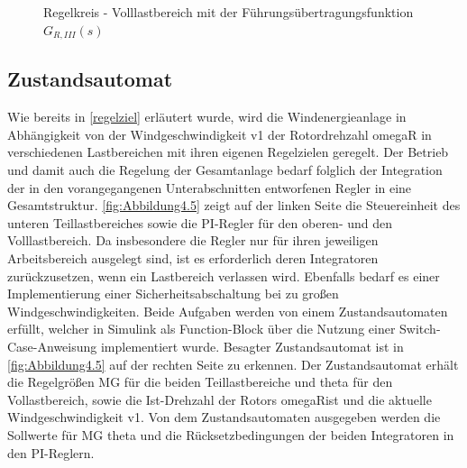 \begin{figure}[H]
    \centering
    \caption[Reglerkreis - Volllastbereich]{Regelkreis - Volllastbereich mit der Führungsübertragungsfunktion $G_{R,III}(s)$ \cite{SkriptSchulte}}
    \label{fig:Abbildung4.4}
\end{figure}

\subsection{Zustandsautomat} \label{statemachine}

Wie bereits in \autoref{regelziel} erläutert wurde, wird die Windenergieanlage in Abhängigkeit von der Windgeschwindigkeit \acs{v1} \bzw der Rotordrehzahl \acs{omegaR} in verschiedenen Lastbereichen mit ihren eigenen Regelzielen geregelt. Der Betrieb und damit auch die Regelung der Gesamtanlage bedarf folglich der Integration der in den vorangegangenen Unterabschnitten entworfenen Regler in eine Gesamtstruktur. \autoref{fig:Abbildung4.5} zeigt auf der linken Seite die Steuereinheit des unteren Teillastbereiches sowie die PI-Regler für den oberen- und den Volllastbereich. Da insbesondere die Regler nur für ihren jeweiligen Arbeitsbereich ausgelegt sind, ist es erforderlich deren Integratoren zurückzusetzen, wenn ein Lastbereich verlassen wird. Ebenfalls bedarf es einer Implementierung einer Sicherheitsabschaltung bei zu großen Windgeschwindigkeiten. Beide Aufgaben werden von einem Zustandsautomaten erfüllt, welcher in Simulink als Function-Block über die Nutzung einer Switch-Case-Anweisung implementiert wurde. Besagter Zustandsautomat ist in \autoref{fig:Abbildung4.5} auf der rechten Seite zu erkennen. Der Zustandsautomat erhält die Regelgrößen \acs{MG} für die beiden Teillastbereiche und \acs{theta} für den Vollastbereich, sowie die Ist-Drehzahl der Rotors \acs{omegaRist} und die aktuelle Windgeschwindigkeit \acs{v1}. Von dem Zustandsautomaten ausgegeben werden die Sollwerte für \acs{MG} \bzw \acs{theta} und die Rücksetzbedingungen der beiden Integratoren in den PI-Reglern. 

